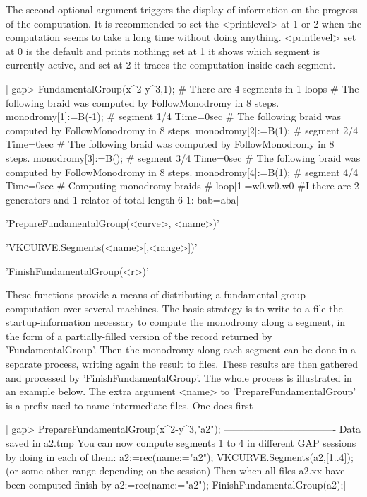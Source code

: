 The second optional argument triggers  the display of information on the
progress of the  computation. It is recommended to  set the <printlevel>
at 1 or 2  when the computation seems to take a  long time without doing
anything. <printlevel> set  at 0 is the default and  prints nothing; set
at 1 it shows which segment is  currently active, and set at 2 it traces
the computation inside each segment.

|    gap> FundamentalGroup(x^2-y^3,1);
    # There are 4 segments in 1 loops
    # The following braid was computed by FollowMonodromy in 8 steps.
    monodromy[1]:=B(-1);
    # segment 1/4 Time=0sec
    # The following braid was computed by FollowMonodromy in 8 steps.
    monodromy[2]:=B(1);
    # segment 2/4 Time=0sec
    # The following braid was computed by FollowMonodromy in 8 steps.
    monodromy[3]:=B();
    # segment 3/4 Time=0sec
    # The following braid was computed by FollowMonodromy in 8 steps.
    monodromy[4]:=B(1);
    # segment 4/4 Time=0sec
    # Computing monodromy braids
    # loop[1]=w0.w0.w0
    #I  there are 2 generators and 1 relator of total length 6
    1: bab=aba|


'PrepareFundamentalGroup(<curve>, <name>)'

'VKCURVE.Segments(<name>[,<range>])'

'FinishFundamentalGroup(<r>)'

These  functions provide  a means  of distributing  a fundamental  group
computation over  several machines.  The basic strategy  is to  write to
a  file  the  startup-information  necessary to  compute  the  monodromy
along  a  segment,  in  the   form  of  a  partially-filled  version  of
the  record returned  by  'FundamentalGroup'. Then  the monodromy  along
each  segment can  be  done in  a separate  process,  writing again  the
result  to files.  These  results  are then  gathered  and processed  by
'FinishFundamentalGroup'. The whole process is illustrated in an example
below.  The  extra argument  <name>  to  'PrepareFundamentalGroup' is  a
prefix used to name intermediate files. One does first \:

|    gap> PrepareFundamentalGroup(x^2-y^3,"a2");
        ----------------------------------
    Data saved in a2.tmp
    You can now compute segments 1 to 4
    in different GAP sessions by doing in each of them:
        a2:=rec(name:="a2");
        VKCURVE.Segments(a2,[1..4]);
    (or some other range depending on the session)
    Then when all files a2.xx have been computed finish by
        a2:=rec(name:="a2");
        FinishFundamentalGroup(a2);|

